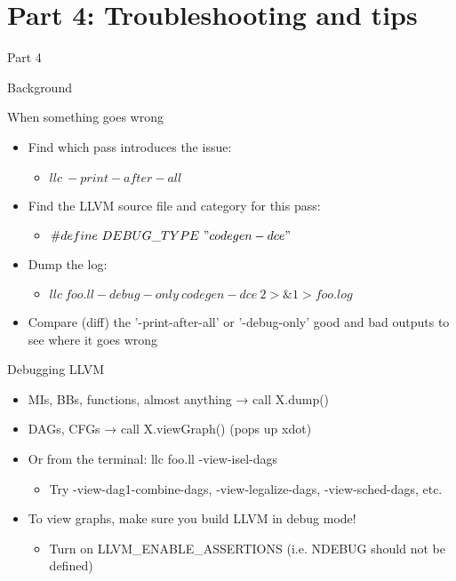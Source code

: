 \section{Part 4: Troubleshooting and tips}

\begin{frame}{Part 4}

Background

\end{frame}


\begin{frame}{When something goes wrong}

\begin{itemize}
    \item Find which pass introduces the issue:
    \begin{itemize}
        \item $llc\ -print-after-all$
    \end{itemize}
    \item Find the LLVM source file and category for this pass:
    \begin{itemize}
        \item $\#define\ DEBUG\_TYPE\ "codegen-dce"$
    \end{itemize}
    \item Dump the log:
    \begin{itemize}
        \item $llc\ foo.ll -debug-only\ codegen-dce\ 2>\&1 > foo.log$
    \end{itemize}
    \item Compare (diff) the '-print-after-all' or '-debug-only' good and bad outputs to see where it goes wrong
\end{itemize}

\end{frame}


\begin{frame}{Debugging LLVM}

\begin{itemize}
    \item MIs, BBs, functions, almost anything → call X.dump()
    \item DAGs, CFGs → call X.viewGraph() (pops up xdot)
    \item Or from the terminal: llc foo.ll -view-isel-dags
    \begin{itemize}
        \item Try -view-dag1-combine-dags, -view-legalize-dags, -view-sched-dags, etc.
    \end{itemize}
    \item To view graphs, make sure you build LLVM in debug mode!
    \begin{itemize}
        \item Turn on LLVM\_ENABLE\_ASSERTIONS (i.e. NDEBUG should not be defined)
    \end{itemize}
\end{itemize}

\end{frame}

